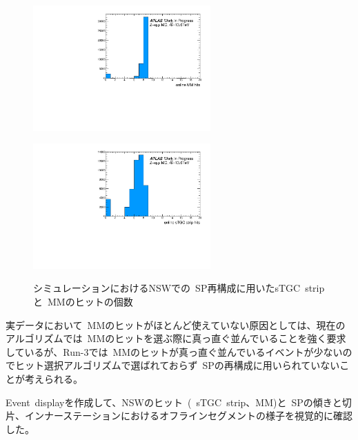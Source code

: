 \begin{figure}[H]
  \begin{minipage}[b]{0.48\linewidth}
      \centering
      \includegraphics[clip, width=6.8cm]{fig/5/MC_onlinemm.pdf}
      \label{fig:5-9-1}
  \end{minipage}
    \begin{minipage}[b]{0.48\linewidth}
      \centering
      \includegraphics[clip, width=6.8cm]{fig/5/MC_onlinestgceta.pdf}
      \label{fig:5-9-2}
  \end{minipage}
  \caption{シミュレーションにおけるNSWでの~SP再構成に用いたsTGC~stripと~MMのヒットの個数}\label{fig:5-9}
\end{figure}


実データにおいて~MMのヒットがほとんど使えていない原因としては、現在のアルゴリズムでは~MMのヒットを選ぶ際に真っ直ぐ並んでいることを強く要求しているが、Run-3では~MMのヒットが真っ直ぐ並んでいるイベントが少ないのでヒット選択アルゴリズムで選ばれておらず~SPの再構成に用いられていないことが考えられる。

Event~displayを作成して、NSWのヒット~(~sTGC~strip、MM)と~SPの傾きと切片、インナーステーションにおけるオフラインセグメントの様子を視覚的に確認した。

